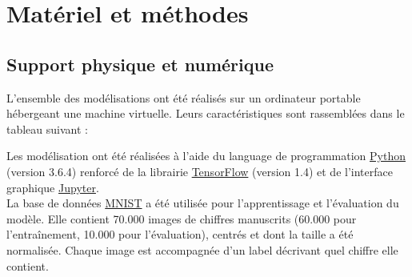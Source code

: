 
\chapter{Matériel et méthodes} %
\label{Materiel_methode} %


\section{Support physique et numérique} %
L'ensemble des modélisations ont été réalisés sur un ordinateur portable hébergeant une machine virtuelle. Leurs caractéristiques sont rassemblées dans le tableau suivant :\\


Les modélisation ont été réalisées à l'aide du language de programmation \href{https://www.python.org/}{Python} (version 3.6.4) renforcé de la librairie \href{https://www.tensorflow.org/}{TensorFlow} (version 1.4) et de l'interface graphique \href{https://jupyter.org/}{Jupyter}.\\
La base de données \href{http://yann.lecun.com/exdb/mnist/}{MNIST} a été utilisée pour l'apprentissage et l'évaluation du modèle. Elle contient 70.000 images de chiffres manuscrits (60.000 pour l'entraînement, 10.000 pour l'évaluation), centrés et dont la taille a été normalisée. Chaque image est accompagnée d'un label décrivant quel chiffre elle contient.


